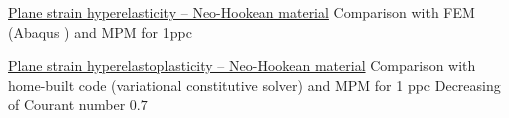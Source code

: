 
\begin{frame}{\href{section4/animation/hyperelasticity_velo/video.mp4}{Plane strain hyperelasticity -- Neo-Hookean material}}
  Comparison with FEM (Abaqus \cite{Abaqus}) and MPM for 1ppc
  \begin{overprint}
    \vspace{1.cm}
    \begin{center}
      
    \end{center}

    \vspace{0.cm}
    \begin{center}
    \end{center}
  \end{overprint}
\end{frame}

\begin{frame}{\href{section4/animation/hyperelasticity_velo/video.mp4}{Plane strain hyperelastoplasticity -- Neo-Hookean material}}
  Comparison with home-built code (variational constitutive solver) and MPM for 1 ppc
  Decreasing of Courant number $0.7$
\end{frame}
